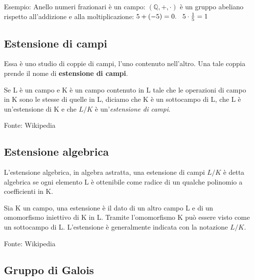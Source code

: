  

\textsf{\small Esempio: Anello numeri frazionari è un campo: $(\mathbb{Q}, +, \cdot)$ è un gruppo abeliano rispetto all'addizione e alla moltiplicazione: $5 + (-5) = 0. \hspace{.3cm} 5 \cdot \frac{1}{5} = 1$}

\subsection{Estensione di campi}

  

\textsf{\small Essa è uno studio di coppie di campi, l'uno contenuto nell'altro. Una tale coppia prende il nome di \textbf{estensione di campi}. }


\textsf{\small Se L è un campo e K è un campo contenuto in L tale che le operazioni di campo in K sono le stesse di quelle in L, diciamo che K è un sottocampo di L, che L è un'estensione di K e che $L/K$ è un'\emph{estensione di campi}.}

\textsf{\small Fonte: Wikipedia \cite{wikipediaestensionedicampi}\relax }

\subsection{Estensione algebrica}

  

\textsf{\small L'estensione algebrica, in algebra astratta, una estensione di campi $L/K$ è detta algebrica se ogni elemento L è ottenibile come radice di un qualche polinomio a coefficienti in K.}

\textsf{\small Sia K un campo, una estensione è il dato di un altro campo L e di un omomorfismo iniettivo di K in L. Tramite l'omomorfismo K può essere visto come un sottocampo di L. L'estensione è generalmente indicata con la notazione $L/K$.}

\textsf{\small Fonte: Wikipedia \cite{wikipediaestensionealgebrica}\relax }

\subsection{Gruppo di Galois}

  

